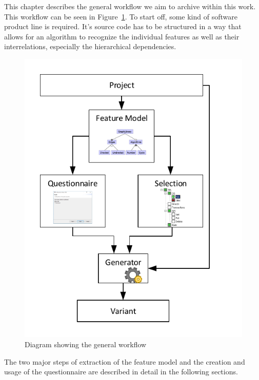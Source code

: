 

This chapter describes the general workflow we aim to archive within this work. This workflow can be seen in Figure~\ref{img-workflow}. To start off, some kind of software product line is required. It's source code has to be structured in a way that allows for an algorithm to recognize the individual features as well as their interrelations, especially the hierarchical dependencies.

\begin{figure}[H]
	\includegraphics{img/img-workflow.pdf}
	\caption{Diagram showing the general workflow}
	\label{img-workflow}
\end{figure}

The two major steps of extraction of the feature model and the creation and usage of the questionnaire are described in detail in the following sections.


